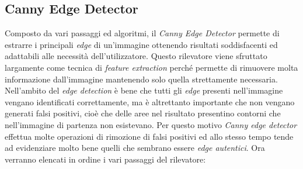 \subsection {Canny Edge Detector}
Composto da vari passaggi ed algoritmi, il \textit{Canny Edge Detector} permette di estrarre i principali \textit{edge} di un'immagine ottenendo risultati soddisfacenti ed adattabili alle necessità dell'utilizzatore.
Questo rilevatore viene sfruttato largamente come tecnica di \textit{feature extraction} perché permette di rimuovere molta informazione dall'immagine mantenendo solo quella strettamente necessaria.
Nell'ambito del \textit{edge detection} è bene che tutti gli \textit{edge} presenti nell'immagine vengano identificati correttamente, ma è altrettanto importante che non vengano generati falsi positivi, cioè che delle aree nel risultato presentino contorni che nell'immagine di partenza non esistevano.
Per questo motivo \textit{Canny edge detector} effettua molte operazioni di rimozione di falsi positivi ed allo stesso tempo tende ad evidenziare molto bene quelli che sembrano essere \textit{edge autentici}.
Ora verranno elencati in ordine i vari passaggi del rilevatore:
